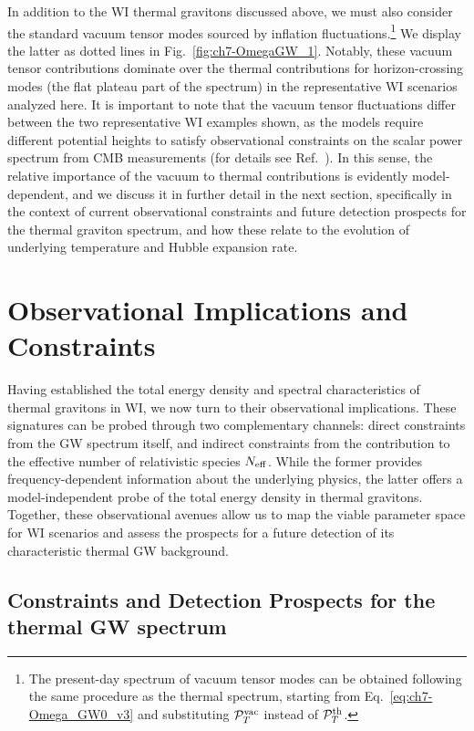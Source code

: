 In addition to the WI thermal  gravitons discussed above, we must also consider the standard vacuum tensor modes sourced by inflation fluctuations.\footnote{The present-day spectrum of vacuum tensor modes can be obtained following the same procedure as the thermal spectrum, starting from Eq.~\eqref{eq:ch7-Omega_GW0_v3} and substituting $\mathcal{P}_T^{\rm vac}$ instead of $\mathcal{P}_T^{\rm th}$.}
We display the latter as dotted lines in Fig.~\ref{fig:ch7-OmegaGW_1}. Notably, these vacuum tensor contributions dominate over the thermal contributions for horizon-crossing modes (the flat plateau part of the spectrum) in the representative WI scenarios analyzed here. It is important to note that the vacuum tensor fluctuations differ between the two representative WI examples shown, as the models require different potential heights to satisfy observational constraints on the scalar power spectrum from CMB measurements (for details see Ref.~\cite{Freese:2024ogj}). In this sense, the relative importance of the vacuum to thermal contributions is evidently model-dependent, and we discuss it in further detail in the next section, specifically in the context of current observational constraints and future detection prospects for the thermal graviton spectrum, and how these relate to the evolution of underlying temperature and Hubble expansion rate.

\section{Observational Implications and Constraints}
\label{sec:ch7-constraints}

Having established the total energy density and spectral characteristics of thermal gravitons in WI, we now turn to their observational implications. These signatures can be probed through two complementary channels: direct constraints from the GW spectrum itself, and indirect constraints from the contribution to the effective number of relativistic species $N_{\rm eff}$. While the former provides frequency-dependent information about the underlying physics, the latter offers a model-independent probe of the total energy density in thermal gravitons. Together, these observational avenues allow us to map the viable parameter space for WI scenarios and assess the prospects for a future detection of its characteristic thermal GW background.

\subsection{Constraints and Detection Prospects for the thermal GW spectrum}


